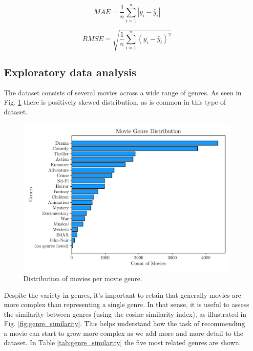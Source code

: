 \documentclass[conference]{IEEEtran}
\begin{document}
\begin{equation}
MAE = \frac{1}{n}\sum^n_{i=1}|y_i-\hat{y}_i|
\end{equation}

\begin{equation}
RMSE = \sqrt{\frac{1}{n}\sum^{n}_{i=1}(y_i - \hat{y}_i)^2}
\end{equation}

\subsection{Exploratory data analysis}

The dataset consists of several movies across a wide range of genres. As seen in Fig. \ref{fig:genre_distribution} there is positively skewed distribution, as is common in this type of dataset.

\begin{figure}[H]
    \centering
    \includegraphics[width=1\linewidth]{assets/genre_distribution.png}
    \caption{Distribution of movies per movie genre.}
    \label{fig:genre_distribution}
\end{figure}

Despite the variety in genres, it's important to retain that generally movies are more complex than representing a single genre. In that sense, it is useful to assess the similarity between genres (using the cosine similarity index), as illustrated in Fig. \ref{fig:genre_similarity}. This helps understand how the task of recommending a movie can start to grow more complex as we add more and more detail to the dataset. In Table \ref{tab:genre_similarity} the five most related genres are shown.
\end{document}
